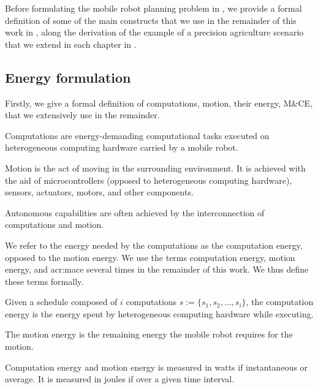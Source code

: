 Before formulating the mobile robot planning problem in , we provide a formal definition of some of the main constructs that we use in the remainder of this work in , along the derivation of the example of a precision agriculture scenario that we extend in each chapter in .

\subsection{Energy formulation}
\label{sec:definitions}

Firstly, we give a formal definition of computations, motion, their energy, M\&CE, that we extensively use in the remainder.

\begin{highlight}
  \begin{defn}\label{def:comps}
    Computations are energy-demanding computational tasks executed on heterogeneous computing hardware carried by a mobile robot.
    
    Motion is the act of moving in the surrounding environment. It is achieved with the aid of microcontrollers (opposed to heterogeneous computing hardware), sensors, actuators, motors, and other components. 
  \end{defn}
\end{highlight}

Autonomous capabilities are often achieved by the interconnection of computations and motion.

We refer to the energy needed by the computations as the computation energy, opposed to the motion energy. We use the terms computation energy, motion energy, and \Gls{acr:mace} several times in the remainder of this work. We thus define these terms formally.

\begin{highlight}
\begin{defn}
  Given a schedule composed of $i$ computations $s:=\{s_1,s_2,\dots,s_i\}$, the computation energy is the energy spent by heterogeneous computing hardware while executing.
  
  The motion energy is the remaining energy the mobile robot requires for the motion.
\end{defn}
\end{highlight}

Computation energy and motion energy is measured in watts if instantaneous or average. It is measured in joules if over a given time interval.

